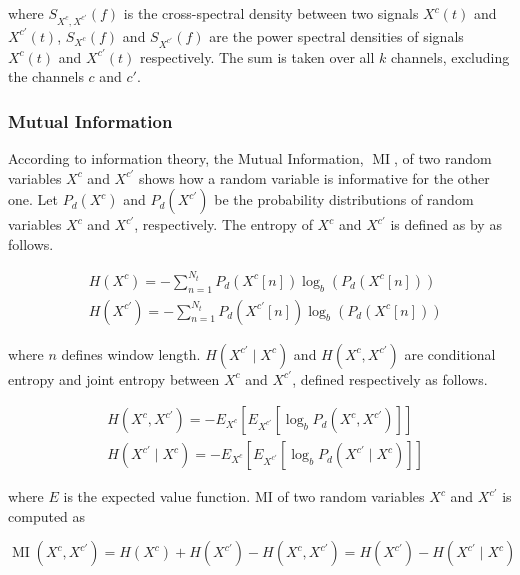 where $S_{X^{c},X^{c'}}(f)$ is the cross-spectral density between two signals $X^{c}(t)$ and $X^{c'}(t)$, $S_{X^{c}}(f)$ and $S_{X^{c'}}(f)$ are the power spectral densities of signals $X^{c}(t)$ and $X^{c'}(t)$ respectively. The sum is taken over all $k$ channels, excluding the channels $c$ and $c'$. 

\subsubsection{Mutual Information}

According to information theory, the Mutual Information, $\operatorname{MI}$, of two random variables $X^{c}$ and $X^{c'}$ shows how a random variable is informative for the other one. Let $P_d(X^{c})$ and $P_d(X^{c'})$ be the probability distributions of random variables $X^{c}$ and $X^{c'}$, respectively. The entropy of $X^{c}$ and $X^{c'}$ is defined as by \cite{gu2023decoding} as follows.

\begin{equation}
\begin{aligned}
& H(X^{c})=-\sum_{n=1}^{N_t} P_d\left(X^{c}[n]\right) \log _{b}\left(P_d\left(X^{c}[n]\right)\right) \\
& H(X^{c'})=-\sum_{n=1}^{N_t} P_d\left(X^{c'}[n]\right) \log _{b}\left(P_d\left(X^{c}[n]\right)\right)
\end{aligned}
\end{equation}

where $n$ defines window length. $H(X^{c'} \mid X^{c})$ and $H(X^{c}, X^{c'})$ are conditional entropy and joint entropy between $X^{c}$ and $X^{c'}$, defined respectively as follows.

\begin{equation}
\begin{aligned}
& H(X^{c}, X^{c'})=-E_{X^{c}}\left[E_{X^{c'}}\left[\log _{b} P_d(X^{c}, X^{c'})\right]\right] \\
& H(X^{c'} \mid X^{c})=-E_{X^{c}}\left[E_{X^{c'}}\left[\log _{b} P_d(X^{c'} \mid X^{c})\right]\right]
\end{aligned}
\end{equation}

where $E$ is the expected value function. MI of two random variables $X^{c}$ and $X^{c'}$ is computed as 

\begin{equation}
\operatorname{MI}(X^{c}, X^{c'})=H(X^{c})+H(X^{c'})-H(X^{c}, X^{c'})=H(X^{c'})-H(X^{c'} \mid X^{c})
\end{equation}

